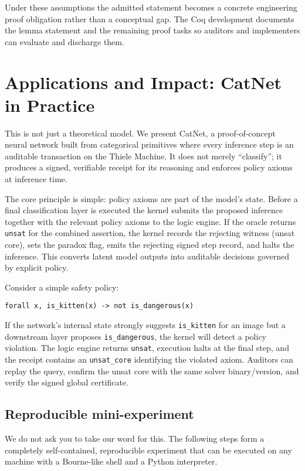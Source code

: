 \documentclass[11pt]{article}
\begin{document}
Under these assumptions the admitted statement becomes a concrete engineering proof obligation rather than a conceptual gap. The Coq development documents the lemma statement and the remaining proof tasks so auditors and implementers can evaluate and discharge them.

\section{Applications and Impact: CatNet in Practice}
This is not just a theoretical model. We present CatNet, a proof-of-concept neural network built from categorical primitives where every inference step is an auditable transaction on the Thiele Machine. It does not merely ``classify''; it produces a signed, verifiable receipt for its reasoning and enforces policy axioms at inference time.

The core principle is simple: policy axioms are part of the model's state. Before a final classification layer is executed the kernel submits the proposed inference together with the relevant policy axioms to the logic engine. If the oracle returns \texttt{unsat} for the combined assertion, the kernel records the rejecting witness (unsat core), sets the paradox flag, emits the rejecting signed step record, and halts the inference. This converts latent model outputs into auditable decisions governed by explicit policy.

Consider a simple safety policy:
\begin{verbatim}
forall x, is_kitten(x) -> not is_dangerous(x)
\end{verbatim}
If the network's internal state strongly suggests \texttt{is\_kitten} for an image but a downstream layer proposes \texttt{is\_dangerous}, the kernel will detect a policy violation. The logic engine returns \texttt{unsat}, execution halts at the final step, and the receipt contains an \texttt{unsat\_core} identifying the violated axiom. Auditors can replay the query, confirm the unsat core with the same solver binary/version, and verify the signed global certificate.

\subsection{Reproducible mini-experiment}
We do not ask you to take our word for this. The following steps form a completely self-contained, reproducible experiment that can be executed on any machine with a Bourne-like shell and a Python interpreter.
\end{document}
